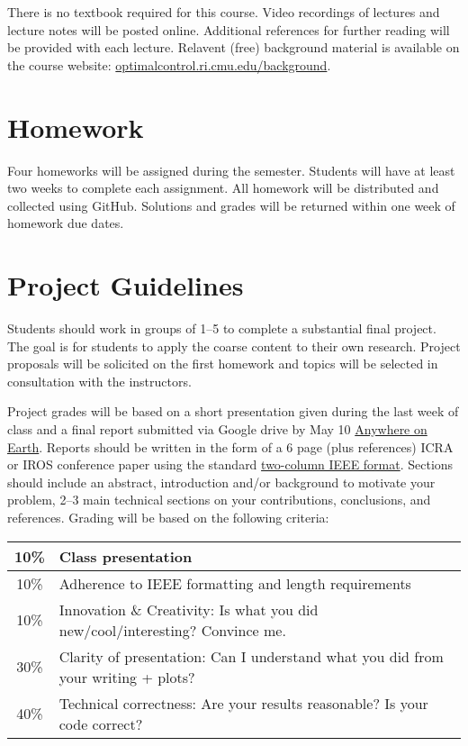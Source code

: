 \documentclass[11pt,letterpaper]{article}
\begin{document}
There is no textbook required for this course. Video recordings of lectures and lecture notes will be posted online. Additional references for further reading will be provided with each lecture. Relavent (free) background material is available on the course website: \href{https://optimalcontrol.ri.cmu.edu/background/}{optimalcontrol.ri.cmu.edu/background}.

\section*{Homework}

Four homeworks will be assigned during the semester. Students will have at least two weeks to complete each assignment. All homework will be distributed and collected using GitHub. Solutions and grades will be returned within one week of homework due dates.


\section*{Project Guidelines}

Students should work in groups of 1--5 to complete a substantial final project. The goal is for students to apply the coarse content to their own research. Project proposals will be solicited on the first homework and topics will be selected in consultation with the instructors.

\medskip
\noindent
Project grades will be based on a short presentation given during the last week of class and a final report submitted via Google drive by May 10 \href{https://time.is/Anywhere_on_Earth}{Anywhere on Earth}. Reports should be written in the form of a 6 page (plus references) ICRA or IROS conference paper using the standard \href{https://www.ieee.org/conferences/publishing/templates.html}{two-column IEEE format}. Sections should include an abstract, introduction and/or background to motivate your problem, 2--3 main technical sections on your contributions, conclusions, and references. Grading will be based on the following criteria:
\newline
\newline
\begin{tabular}{|c|l|}
\hline
10\% & Class presentation \\
\hline
10\% & Adherence to IEEE formatting and length requirements \\
\hline
10\% & Innovation \& Creativity: Is what you did new/cool/interesting? Convince me. \\
\hline
30\% & Clarity of presentation: Can I understand what you did from your writing + plots? \\
\hline
40\% & Technical correctness: Are your results reasonable? Is your code correct? \\
\hline	
\end{tabular}
\end{document}
